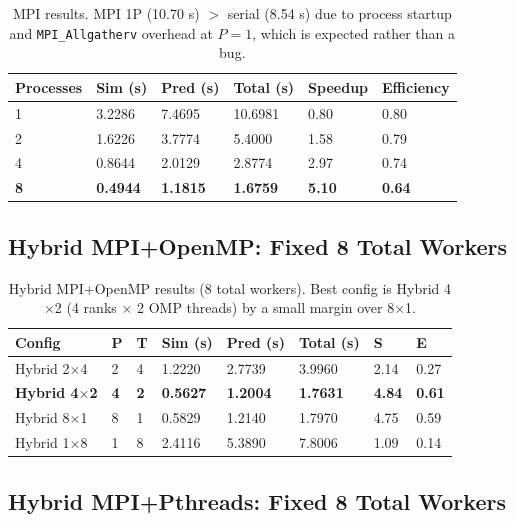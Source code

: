 \documentclass[11pt,a4paper]{article}
\newcommand{\code}[1]{\texttt{\small #1}}
\begin{document}
\begin{table}[H]
\centering
\begin{tabular}{C{1.8cm} R{1.9cm} R{1.9cm} R{2.0cm} R{1.9cm} R{2.2cm}}
\toprule
\textbf{Processes} & \textbf{Sim (s)} & \textbf{Pred (s)} &
\textbf{Total (s)} & \textbf{Speedup} & \textbf{Efficiency} \\
 & 3.2286 & 7.4695 & 10.6981 & 0.80 & 0.80 \\
2 & 1.6226 & 3.7774 & 5.4000 & 1.58 & 0.79 \\
4 & 0.8644 & 2.0129 & 2.8774 & 2.97 & 0.74 \\
\textbf{8} & \textbf{0.4944} & \textbf{1.1815} & \textbf{1.6759} & \textbf{5.10} & \textbf{0.64} \\
\bottomrule
\end{tabular}
\caption{MPI results. MPI 1P (10.70 s) $>$ serial (8.54 s) due to process startup
and \code{MPI\_Allgatherv} overhead at $P=1$, which is expected rather than a bug.}
\end{table}

\FloatBarrier
\subsection{Hybrid MPI+OpenMP: Fixed 8 Total Workers}

\begin{table}[H]
\centering
\begin{tabular}{L{2.6cm} C{0.7cm} C{0.7cm} R{1.4cm} R{1.5cm} R{1.5cm} R{1.0cm} R{1.0cm}}
\toprule
\textbf{Config} & \textbf{P} & \textbf{T} &
\textbf{Sim (s)} & \textbf{Pred (s)} & \textbf{Total (s)} &
\textbf{S} & \textbf{E} \\
\midrule
Hybrid 2$\times$4 & 2 & 4 & 1.2220 & 2.7739 & 3.9960 & 2.14 & 0.27 \\
\textbf{Hybrid 4$\times$2} & \textbf{4} & \textbf{2} & \textbf{0.5627} & \textbf{1.2004} & \textbf{1.7631} & \textbf{4.84} & \textbf{0.61} \\
Hybrid 8$\times$1 & 8 & 1 & 0.5829 & 1.2140 & 1.7970 & 4.75 & 0.59 \\
Hybrid 1$\times$8 & 1 & 8 & 2.4116 & 5.3890 & 7.8006 & 1.09 & 0.14 \\
\bottomrule
\end{tabular}
\caption{Hybrid MPI+OpenMP results (8 total workers). Best config is Hybrid 4$\times$2 (4 ranks $\times$ 2 OMP threads) by a small margin over 8$\times$1.}
\end{table}

\FloatBarrier
\subsection{Hybrid MPI+Pthreads: Fixed 8 Total Workers}
\end{document}
